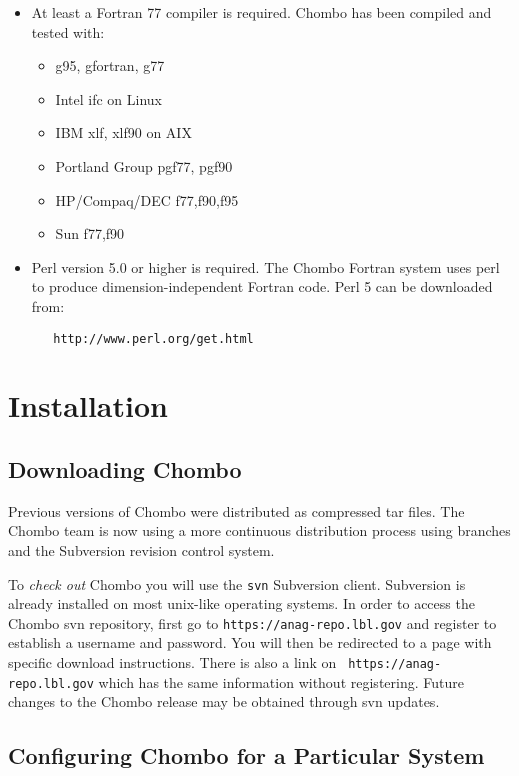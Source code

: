 \begin{itemize}
\item  At least a Fortran 77 compiler is required. Chombo has been compiled and tested with:
  \begin{itemize}
  \item g95, gfortran, g77
  \item Intel ifc on Linux
  \item IBM xlf, xlf90 on AIX
  \item Portland Group pgf77, pgf90
  \item HP/Compaq/DEC f77,f90,f95
  \item Sun f77,f90
  \end{itemize}
  
\item Perl version 5.0 or higher is required.  The Chombo
  Fortran system uses perl to produce dimension-independent Fortran code.
  Perl 5 can be downloaded from:
\begin{verbatim}
   http://www.perl.org/get.html
\end{verbatim}
\end{itemize}


\section{Installation}
\label{sec::install}
\subsection{Downloading Chombo}
Previous versions of Chombo were distributed as compressed tar files.
The Chombo team is now using a more continuous distribution process
using branches and the Subversion revision control system.

To {\it check out} Chombo you will use the {\tt svn} Subversion client.
Subversion is already installed on most unix-like operating
systems. In order to access the Chombo svn repository, first go to
{\tt https://anag-repo.lbl.gov} and register to establish a username
and password. You will then be redirected to a page with specific
download instructions. There is also a link on {\tt
  https://anag-repo.lbl.gov} which has the same information without
registering. Future changes to the Chombo release may be obtained
through svn updates.


\subsection{Configuring Chombo for a Particular
  System \label{subsec:configure} }


